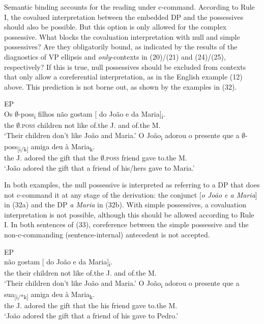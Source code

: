 \documentclass[output=paper]{langsci/langscibook}
\begin{document}
Semantic binding accounts for the reading under c-command. According to Rule I, the covalued interpretation between the embedded DP and the possessives should also be possible. But this option is only allowed for the complex possessive. What blocks the covaluation interpretation with null and simple possessives? Are they obligatorily bound, as indicated by the results of the diagnostics of VP ellipsis and \textit{only}{}-contexts in (20)/(21) and (24)/(25), respectively? If this is true, null possessives should be excluded from contexts that only allow a coreferential interpretation, as in the English example (12) above. This prediction is not borne out, as shown by the examples in (32).

\ea%
         EP\label{ex:wein:32}\\
    \ea  
    \gll Os $\emptyset$-poss\textsubscript{i} filhos não gostam [ do João e da Maria]\textsubscript{i}.\\
         the $\emptyset$\textsc{.poss} children not like {} of.the J. and of.the M.\\
    \glt ‘Their children don’t like João and Maria.’
    \ex 
    \gll O João\textsubscript{i} adorou o presente que a $\emptyset$-poss\textsubscript{[i/k]} amiga deu à Maria\textsubscript{k}.\\
         the J. adored the gift that the $\emptyset$\textsc{.poss} friend gave to.the M.\\
    \glt ‘João adored the gift that a friend of his/hers gave to Maria.’
    \z
\z    

In both examples, the null possessive is interpreted as referring to a DP that does not c-command it at any stage of the derivation: the conjunct [\textit{o João e a Maria}] in (32a) and the DP \textit{a Maria} in (32b). With simple possessives, a covaluation interpretation is not possible, although this should be allowed according to Rule I. In both sentences of (33), coreference between the simple possessive and the non-c-commanding (sentence-internal) antecedent is not accepted.

\ea%
         EP\label{ex:wein:33}\\
    \ea  
    \gll {} não gostam [ do João e da Maria]\textsubscript{i}.\\
         {} the their children not like {} of.the J. and of.the M.\\
    \glt ‘Their children don’t like João and Maria.’
    \ex  
    \gll O João\textsubscript{i} adorou o presente que a sua\textsubscript{[i/*k]} amiga deu à Maria\textsubscript{k}.\\
         the J. adored the gift that the his friend gave to.the M.\\
    \glt ‘João adored the gift that a friend of his gave to Pedro.’
    \z
\z
\end{document}
